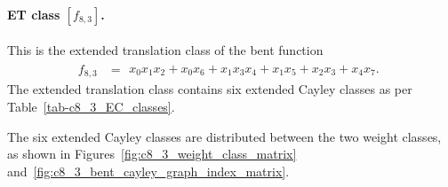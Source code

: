 \documentclass[12pt,a4paper]{article}
\begin{document}
\paragraph*{ET class $[f_{8,3}]$.}
%
This is the extended translation class of the bent function
\small{}
\begin{align*}
f_{ 8 , 3 } &=
\begin{array}{l}
x_{0} x_{1} x_{2} + x_{0} x_{6} + x_{1} x_{3} x_{4} + x_{1} x_{5} + x_{2} x_{3} + x_{4} x_{7}.
\end{array}
\end{align*}
\normalsize{}
The extended translation class contains six extended Cayley classes as per Table~\ref{tab-c8_3_EC_classes}.

The six extended Cayley classes are distributed between the two weight classes,
as shown in Figures~\ref{fig:c8_3_weight_class_matrix} and~\ref{fig:c8_3_bent_cayley_graph_index_matrix}.
\end{document}
